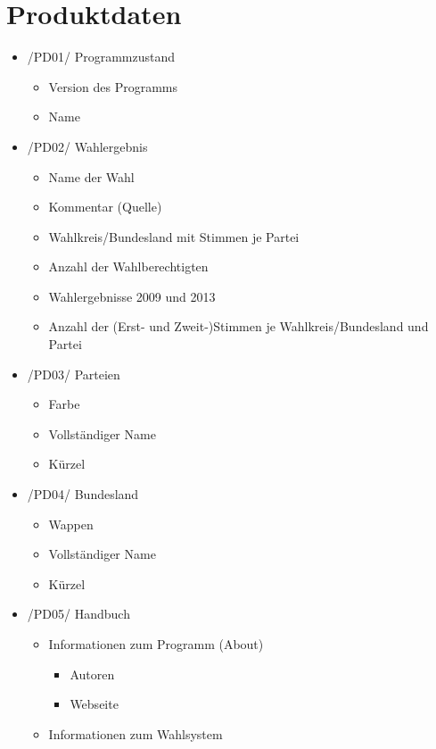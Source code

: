 \documentclass[10pt,a4paper]{article}
\begin{document}
\section{Produktdaten}
\begin{itemize}
	\item /PD01/ Programmzustand
	\begin{itemize}
		\item Version des Programms
		\item Name
	\end{itemize}
	
	\item /PD02/ Wahlergebnis
	\begin{itemize}
		\item Name der Wahl
		\item Kommentar (Quelle)
		\item Wahlkreis/Bundesland mit Stimmen je Partei
		\item Anzahl der Wahlberechtigten
		\item Wahlergebnisse 2009 und 2013
		\item Anzahl der (Erst- und Zweit-)Stimmen je Wahlkreis/Bundesland und Partei
	\end{itemize}
	
	\item /PD03/ Parteien
	\begin{itemize}
		\item Farbe
		\item Vollständiger Name
		\item Kürzel
	\end{itemize}
	
	\item /PD04/ Bundesland
	\begin{itemize}
		\item Wappen		
		\item Vollständiger Name
		\item Kürzel
	\end{itemize}
	
	\item /PD05/ Handbuch
	\begin{itemize}
		\item Informationen zum Programm (About)
		\begin{itemize}
			\item Autoren
			\item Webseite
		\end{itemize}
		\item Informationen zum Wahlsystem
	\end{itemize}
\end{itemize}
\end{document}
